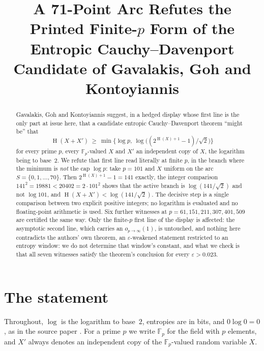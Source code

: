 \documentclass[11pt]{amsart}
\title[A 71-point arc refutes the printed finite-$p$ form of a candidate]
{A 71-Point Arc Refutes the Printed Finite-$p$ Form of the Entropic
 Cauchy--Davenport Candidate of Gavalakis, Goh and Kontoyiannis}
\date{}
\theoremstyle{remark}
\DeclareMathOperator{\Ent}{H}
\newcommand{\Fp}{\mathbb F_p}
\begin{document}
\begin{abstract}
Gavalakis, Goh and Kontoyiannis suggest, in a hedged display whose first line
is the only part at issue here, that a candidate entropic Cauchy--Davenport
theorem ``might be'' that
\[
  \Ent(X+X')\ \ge\ \min\bigl\{\log p,\
  \log\bigl((2^{\Ent(X)+1}-1)/\sqrt2\bigr)\bigr\}
\]
for every prime $p$, every $\Fp$-valued $X$ and $X'$ an independent copy of
$X$, the logarithm being to base~$2$.  We refute that first line read literally at
finite $p$, in the branch where the minimum is \emph{not} the cap $\log p$:
take $p=101$ and
$X$ uniform on the arc $S=\{0,1,\dots,70\}$.  Then $2^{\Ent(X)+1}-1=141$
exactly, the integer comparison $141^{2}=19881<20402=2\cdot101^{2}$ shows that
the active branch is $\log(141/\sqrt2)$ and not $\log 101$, and
$\Ent(X+X')<\log(141/\sqrt2)$.  The decisive step is a single comparison
between two explicit positive integers; no logarithm is evaluated and no
floating-point arithmetic is used.  Six further witnesses
at $p=61,151,211,307,401,509$ are certified the same way.  Only the finite-$p$
first line of the display is affected: the asymptotic second line, which
carries an $o_{p\to\infty}(1)$, is untouched, and nothing here contradicts the
authors' own theorem, an $\varepsilon$-weakened statement restricted to an
entropy window: we do not determine that window's constant, and what we check
is that all seven witnesses satisfy the theorem's conclusion for every
$\varepsilon>0.023$.
\end{abstract}

\maketitle

\section{The statement}

Throughout, $\log$ is the logarithm to base~$2$, entropies are in bits, and
$0\log 0=0$, as in the source paper \cite{GGK}.  For a prime $p$ we write
$\Fp$ for the field with $p$ elements, and $X'$ always denotes an independent
copy of the $\Fp$-valued random variable $X$.
\end{document}
